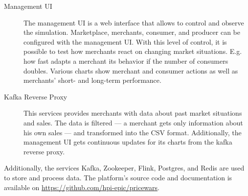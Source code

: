 \begin{description}
	\item [Management UI]
		The management UI is a web interface that allows to control and observe the simulation.
		Marketplace, merchants, consumer, and producer can be configured with the management UI.
		With this level of control, it is possible to test how merchants react on changing market situations. E.g. how fast adapts a merchant its behavior if the number of consumers doubles.
		Various charts show merchant and consumer actions as well as merchants' short- and long-term performance.
	\item [Kafka Reverse Proxy]
		This services provides merchants with data about past market situations and sales.
		The data is filtered --- a merchant gets only information about his own sales --- and transformed into the CSV format.
		Additionally, the management UI gets continuous updates for its charts from the kafka reverse proxy.
		
\end{description}

Additionally, the services Kafka, Zookeeper, Flink, Postgres, and Redis are used to store and process data.
The platform's source code and documentation is available on \url{https://github.com/hpi-epic/pricewars}.
